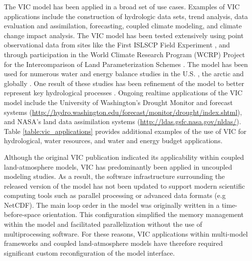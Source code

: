 \documentclass[gmd, manuscript]{copernicus}
\begin{document}
  The VIC model has been applied in a broad set of use cases.
  Examples of VIC applications include the construction of hydrologic data sets, trend analysis, data evaluation and assimilation, forecasting, coupled climate modeling, and climate change impact analysis.
  The VIC model has been tested extensively using point observational data from sites like the First ISLSCP Field Experiment \citep[FIFE;][]{Liang_1994}, and through participation in the World Climate Research Program (WCRP) Project for the Intercomparison of Land Parameterization Schemes \citep[PILPS;][]{Bowling_2003,wood_1998}.
  The model has been used for numerous water and energy balance studies in the U.S. \citep{Abdulla_1997,Nijssen_1997}, the arctic \citep{Adam_2008,Su_2005,Tan_2011,Hamman_2016a} and globally \citep{Nijssen_2001a,Nijssen_2001b,Nijssen_2001c,Sheffield_2009}.
  One result of these studies has been refinement of the model to better represent key hydrological processes \citep{Andreadis_2009,Cherkauer_2003,Liang_1996,Liang_1999}.
  Ongoing realtime applications of the VIC model include the University of Washington’s Drought Monitor and forecast systems (\url{http://hydro.washington.edu/forecast/monitor/drought/index.shtml}), and NASA’s land data assimilation systems (\url{http://ldas.gsfc.nasa.gov/nldas/}).
  Table \ref{table:vic_applications} provides additional examples of the use of VIC for hydrological, water resources, and water and energy budget applications.

  Although the original VIC publication \citep{Liang_1994} indicated its applicability within coupled land-atmosphere models, VIC has predominantly been applied in uncoupled modeling studies.
  As a result, the software infrastructure surrounding the released version of the model has not been updated to support modern scientific computing tools such as parallel processing or advanced data formats (e.g NetCDF).
  The main loop order in the model was originally written in a time-before-space orientation.
  This configuration simplified the memory management within the model and facilitated parallelization without the use of multiprocessing software.
  For these reasons, VIC applications within multi-model frameworks \citep[e.g. NASA LIS, ][]{Kumar_2006} and coupled land-atmosphere models \citep[e.g. RASM, ][]{Hamman_2016a} have therefore required significant custom reconfiguration of the model interface.
\end{document}
